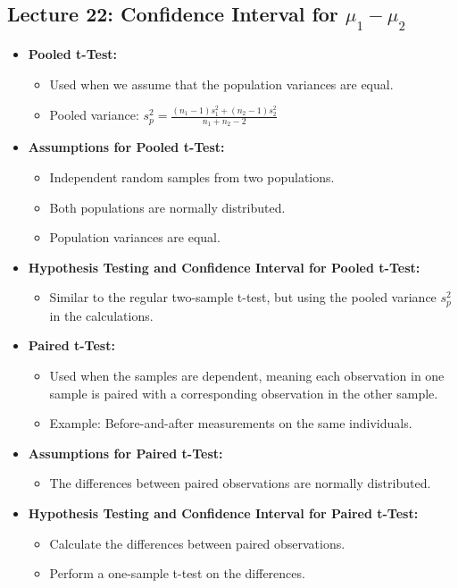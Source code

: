 \documentclass{article}
\begin{document}
\begin{multicols}{2}
\section*{Lecture 22: Confidence Interval for $\mu_1 - \mu_2$}

\begin{itemize}
\item \textbf{Pooled t-Test:}
    \begin{itemize}
        \item Used when we assume that the population variances are equal.
        \item Pooled variance: $s_p^2 = \frac{(n_1 - 1)s_1^2 + (n_2 - 1)s_2^2}{n_1 + n_2 - 2}$
    \end{itemize}
\item \textbf{Assumptions for Pooled t-Test:}
    \begin{itemize}
        \item Independent random samples from two populations.
        \item Both populations are normally distributed.
        \item Population variances are equal.
    \end{itemize}
\item \textbf{Hypothesis Testing and Confidence Interval for Pooled t-Test:}
    \begin{itemize}
        \item Similar to the regular two-sample t-test, but using the pooled variance $s_p^2$ in the calculations.
    \end{itemize}
\item \textbf{Paired t-Test:}
    \begin{itemize}
        \item Used when the samples are dependent, meaning each observation in one sample is paired with a corresponding observation in the other sample.
        \item Example: Before-and-after measurements on the same individuals.
    \end{itemize}
\item \textbf{Assumptions for Paired t-Test:}
    \begin{itemize}
        \item The differences between paired observations are normally distributed.
    \end{itemize}
\item \textbf{Hypothesis Testing and Confidence Interval for Paired t-Test:}
    \begin{itemize}
        \item Calculate the differences between paired observations.
        \item Perform a one-sample t-test on the differences.
    \end{itemize}
\end{itemize}


\end{multicols}
\end{document}
